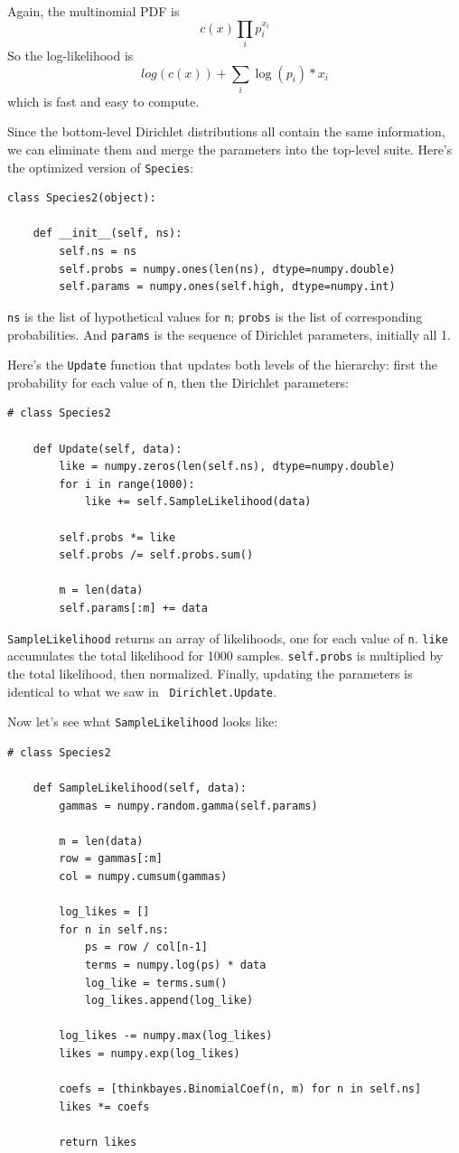 \documentclass[12pt]{book}
\begin{document}
Again, the multinomial PDF is
%
\[ c(x) \prod_i p_i^{x_i}\]
%
So the log-likelihood is
%
\[ log(c(x)) + \sum_i \log(p_i) * x_i \]
%
which is fast and easy to compute.

Since the bottom-level Dirichlet distributions all contain the same
information, we can eliminate them and merge the parameters into
the top-level suite.  Here's the optimized version of {\tt Species}:

\begin{verbatim}
class Species2(object):
    
    def __init__(self, ns):
        self.ns = ns
        self.probs = numpy.ones(len(ns), dtype=numpy.double)
        self.params = numpy.ones(self.high, dtype=numpy.int)
\end{verbatim}

{\tt ns} is the list of hypothetical values for {\tt n};
{\tt probs} is the list of corresponding probabilities.  And
{\tt params} is the sequence of Dirichlet parameters, initially
all 1.

Here's the {\tt Update} function that updates both levels of
the hierarchy: first the probability for each value of {\tt n},
then the Dirichlet parameters:

\begin{verbatim}
# class Species2

    def Update(self, data):
        like = numpy.zeros(len(self.ns), dtype=numpy.double)
        for i in range(1000):
            like += self.SampleLikelihood(data)

        self.probs *= like
        self.probs /= self.probs.sum()

        m = len(data)
        self.params[:m] += data
\end{verbatim}

{\tt SampleLikelihood} returns an array of likelihoods, one for
each value of {\tt n}.  {\tt like} accumulates the total likelihood
for 1000 samples.  {\tt self.probs}
is multiplied by the total likelihood, then normalized.
Finally, updating the parameters is identical to what we saw in {\tt
  Dirichlet.Update}.

Now let's see what {\tt SampleLikelihood} looks like:

\begin{verbatim}
# class Species2

    def SampleLikelihood(self, data):
        gammas = numpy.random.gamma(self.params)

        m = len(data)
        row = gammas[:m]
        col = numpy.cumsum(gammas)

        log_likes = []
        for n in self.ns:
            ps = row / col[n-1]
            terms = numpy.log(ps) * data
            log_like = terms.sum()
            log_likes.append(log_like)

        log_likes -= numpy.max(log_likes)
        likes = numpy.exp(log_likes)

        coefs = [thinkbayes.BinomialCoef(n, m) for n in self.ns]
        likes *= coefs

        return likes
\end{verbatim}
\end{document}
